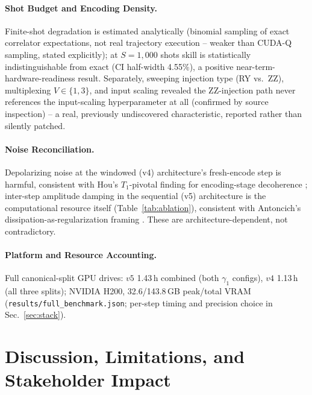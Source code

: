 \documentclass[11pt,twocolumn]{article}
\begin{document}
\paragraph{Shot Budget and Encoding Density.}
Finite-shot degradation is estimated analytically (binomial sampling of exact correlator
expectations, not real trajectory execution -- weaker than CUDA-Q sampling, stated explicitly);
at $S{=}1{,}000$ shots skill is statistically indistinguishable from exact (CI half-width 4.55\%),
a positive near-term-hardware-readiness result. Separately, sweeping injection type (RY vs.\ ZZ),
multiplexing $V\in\{1,3\}$, and input scaling revealed the ZZ-injection path never references the
input-scaling hyperparameter at all (confirmed by source inspection) -- a real, previously
undiscovered characteristic, reported rather than silently patched.

\paragraph{Noise Reconciliation.}
Depolarizing noise at the windowed (v4) architecture's fresh-encode step is harmful, consistent
with Hou's $T_1$-pivotal finding for encoding-stage decoherence \cite{hou}; inter-step amplitude
damping in the sequential (v5) architecture is the computational resource itself
(Table~\ref{tab:ablation}), consistent with Antoncich's dissipation-as-regularization framing
\cite{antoncich}. These are architecture-dependent, not contradictory.

\paragraph{Platform and Resource Accounting.}
Full canonical-split GPU drives: $v5$ 1.43\,h combined (both $\gamma_1$ configs), $v4$ 1.13\,h
(all three splits); NVIDIA H200, 32.6/143.8\,GB peak/total VRAM (\texttt{results/full\_benchmark.json};
per-step timing and precision choice in Sec.~\ref{sec:stack}).

\section{Discussion, Limitations, and Stakeholder Impact}
\end{document}
